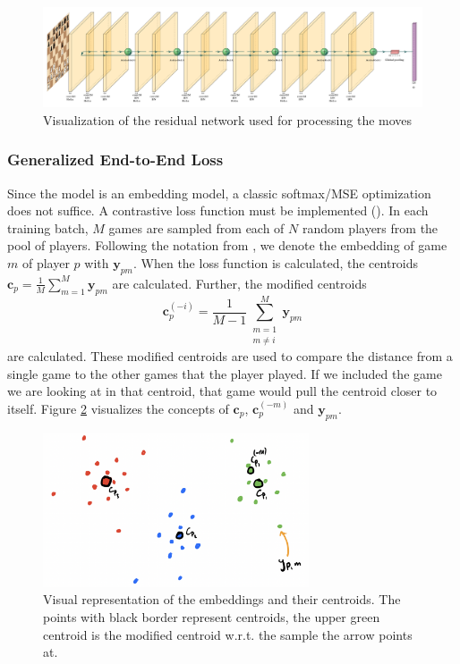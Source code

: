 \begin{figure}[ht]
    \centering
    \includegraphics[width=6 in]{figures/Tilraun.pdf}
    \caption{Visualization of the residual network used for processing the moves}
    \label{fig:res_net}
\end{figure}

\subsubsection{Generalized End-to-End Loss} \label{ge2e-section}
Since the model is an embedding model, a classic softmax/MSE optimization does not suffice. A contrastive loss function must be implemented (\citealp{ge2e}). In each training batch, $M$ games are sampled from each of $N$ random players from the pool of players. Following the notation from \cite{main_article}, we denote the embedding of game $m$ of player $p$ with $\mathbf{y}_{pm}$. When the loss function is calculated, the centroids $\mathbf{c}_p = \frac{1}{M}\sum_{m=1}^M\mathbf{y}_{pm}$ are calculated. Further, the modified centroids 
\[\mathbf{c}_{p}^{(-i)} = \frac{1}{M-1}\sum_{\substack{m = 1 \\ m \neq i}}^M\mathbf{y}_{pm}\]
are calculated. These modified centroids are used to compare the distance from a single game to the other games that the player played. If we included the game we are looking at in that centroid, that game would pull the centroid closer to itself. Figure \ref{fig:ge2e-visualization} visualizes the concepts of $\mathbf{c}_p$, $\mathbf{c}_p^{(-m)}$ and $\mathbf{y}_{pm}$.
\begin{figure}[ht]
    \centering
    \includegraphics[width=0.7\textwidth]{figures/ge2e-visualization.png}
    \caption{Visual representation of the embeddings and their centroids. The points with black border represent centroids, the upper green centroid is the modified centroid w.r.t. the sample the arrow points at.}
    \label{fig:ge2e-visualization}
\end{figure}

